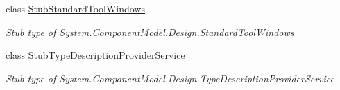 \begin{DoxyCompactItemize}
class \hyperlink{class_system_1_1_component_model_1_1_design_1_1_fakes_1_1_stub_standard_tool_windows}{Stub\-Standard\-Tool\-Windows}
\begin{DoxyCompactList}\small\item\em Stub type of System.\-Component\-Model.\-Design.\-Standard\-Tool\-Windows\end{DoxyCompactList}\item 
class \hyperlink{class_system_1_1_component_model_1_1_design_1_1_fakes_1_1_stub_type_description_provider_service}{Stub\-Type\-Description\-Provider\-Service}
\begin{DoxyCompactList}\small\item\em Stub type of System.\-Component\-Model.\-Design.\-Type\-Description\-Provider\-Service\end{DoxyCompactList}\end{DoxyCompactItemize}
